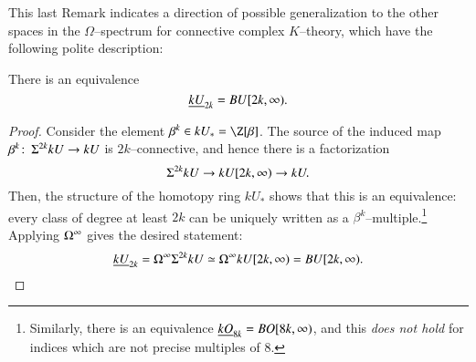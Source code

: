 This last Remark indicates a direction of possible generalization to the other spaces in the $\Omega$--spectrum for connective complex $K$--theory, which have the following polite description:
\begin{lemma}
There is an equivalence \[\underline{\smash{kU}}_{2k} = BU[2k, \infty).\]
\end{lemma}
\begin{proof}
Consider the element $\beta^k \in kU_* = \Z[\beta]$.  The source of the induced map $\beta^k\colon\thinspace \Sigma^{2k} kU \to kU$ is $2k$--connective, and hence there is a factorization \[\Sigma^{2k} kU \to kU[2k, \infty) \to kU.\]  Then, the structure of the homotopy ring $kU_*$ shows that this is an equivalence: every class of degree at least $2k$ can be uniquely written as a $\beta^k$--multiple.\footnote{Similarly, there is an equivalence $\underline{\smash{kO}}_{8k} = BO[8k, \infty)$, and this \emph{does not hold} for indices which are not precise multiples of $8$.}  Applying $\Omega^\infty$ gives the desired statement: \[\underline{\smash{kU}}_{2k} = \Omega^\infty \Sigma^{2k} kU \simeq \Omega^\infty kU[2k, \infty) = BU[2k, \infty). \qedhere\]
\end{proof}

